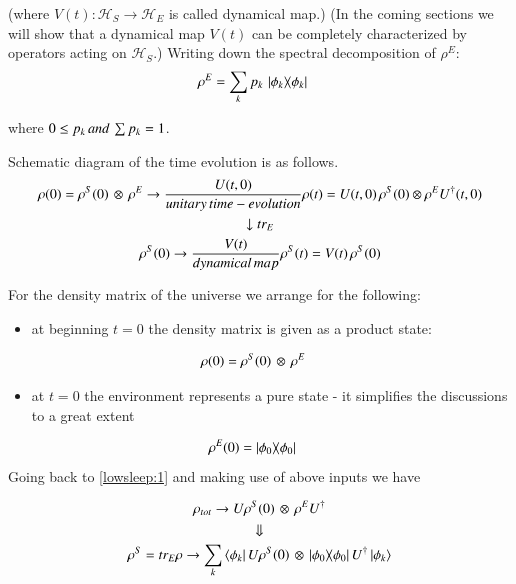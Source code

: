 (where $V (t): \mathcal{H}_{S} \rightarrow \mathcal{H}_{E} $ is called dynamical map.) (In the coming sections we will show that a dynamical map $V (t)$ can be completely characterized by operators acting on $\mathcal{H}_{S}.$) Writing down the spectral decomposition of $\rho^{E}$:
\begin{align}
\rho^{E} &= \sum_{k}p_{k}\thinspace\dyad{\phi_{k}}{\phi_{k}} 
\end{align}

where $ 0\leq {{p}_{k}} \thinspace and \thinspace \sum p_{k} =1$.


Schematic diagram of the time evolution is as follows.
\begin{gather}
\rho(0) =\rho^{S}(0)\thinspace \otimes\thinspace \rho^{E} \rightarrow\frac{U(t,0)}{unitary\thinspace time-evolution}\rho(t)= U(t,0)\thinspace {\rho}^{S}(0)\otimes{\rho}^{E}{U}^{\dagger}(t,0)\label{aft33:48}\\
\downarrow t{ r }_{ E }\notag \\
\rho^{S}(0) \rightarrow\frac{V(t)}{dynamical\thinspace map}\rho^{S}(t) = V(t)\thinspace \rho^{S}(0)\label{aft33:50}
\end{gather}






For the density matrix  of the universe we arrange for the following:
\begin{itemize}
\item at beginning $t = 0$ the density matrix is given as a product state:
\end{itemize}
\begin{align}\label{aft33:51}
\rho(0) &= \rho^{S}(0)\thinspace \otimes\thinspace \rho^{E}
\end{align}
\begin{itemize}
\item at $t = 0$ the environment represents a pure state - it  simplifies the discussions to a great extent
\end{itemize}
\begin{align}
\rho^{E}(0)&=\dyad{\phi_{0}}{\phi_{0}}
\end{align}
Going back to \eqref{lowsleep:1} and making use of above inputs we have 

\begin{gather}
\rho_{tot}\rightarrow U\rho^{S}(0)\thinspace \otimes\thinspace \rho^{E}U^{\dagger}\label{aft33:52}\\
\Downarrow \notag\\
\rho^{S}=tr_{E}\rho \rightarrow \sum_{k} \bra{\phi_{k}}U\rho^{S}(0)\thinspace \otimes\thinspace \dyad{\phi_{0}}{\phi_{0}}U^{\dagger}\ket{\phi_{k}}\label{aft33:54}
\end{gather}








